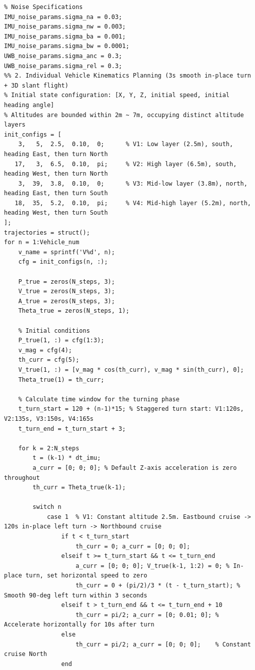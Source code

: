 \documentclass[twocolumn,10pt]{article}
\begin{document}
\begin{lstlisting}
% Noise Specifications
IMU_noise_params.sigma_na = 0.03;      
IMU_noise_params.sigma_nw = 0.003;     
IMU_noise_params.sigma_ba = 0.001;     
IMU_noise_params.sigma_bw = 0.0001;    
UWB_noise_params.sigma_anc = 0.3;     
UWB_noise_params.sigma_rel = 0.3;  
%% 2. Individual Vehicle Kinematics Planning (3s smooth in-place turn + 3D slant flight)
% Initial state configuration: [X, Y, Z, initial speed, initial heading angle]
% Altitudes are bounded within 2m ~ 7m, occupying distinct altitude layers
init_configs = [
    3,   5,  2.5,  0.10,  0;      % V1: Low layer (2.5m), south, heading East, then turn North
   17,   3,  6.5,  0.10,  pi;     % V2: High layer (6.5m), south, heading West, then turn North
    3,  39,  3.8,  0.10,  0;      % V3: Mid-low layer (3.8m), north, heading East, then turn South
   18,  35,  5.2,  0.10,  pi;     % V4: Mid-high layer (5.2m), north, heading West, then turn South
];
trajectories = struct();
for n = 1:Vehicle_num
    v_name = sprintf('V%d', n);
    cfg = init_configs(n, :);
    
    P_true = zeros(N_steps, 3);
    V_true = zeros(N_steps, 3);
    A_true = zeros(N_steps, 3);
    Theta_true = zeros(N_steps, 1);
    
    % Initial conditions
    P_true(1, :) = cfg(1:3);
    v_mag = cfg(4);
    th_curr = cfg(5);
    V_true(1, :) = [v_mag * cos(th_curr), v_mag * sin(th_curr), 0];
    Theta_true(1) = th_curr;
    
    % Calculate time window for the turning phase
    t_turn_start = 120 + (n-1)*15; % Staggered turn start: V1:120s, V2:135s, V3:150s, V4:165s
    t_turn_end = t_turn_start + 3;
    
    for k = 2:N_steps
        t = (k-1) * dt_imu;
        a_curr = [0; 0; 0]; % Default Z-axis acceleration is zero throughout
        th_curr = Theta_true(k-1);
        
        switch n
            case 1  % V1: Constant altitude 2.5m. Eastbound cruise -> 120s in-place left turn -> Northbound cruise
                if t < t_turn_start
                    th_curr = 0; a_curr = [0; 0; 0];
                elseif t >= t_turn_start && t <= t_turn_end
                    a_curr = [0; 0; 0]; V_true(k-1, 1:2) = 0; % In-place turn, set horizontal speed to zero
                    th_curr = 0 + (pi/2)/3 * (t - t_turn_start); % Smooth 90-deg left turn within 3 seconds
                elseif t > t_turn_end && t <= t_turn_end + 10
                    th_curr = pi/2; a_curr = [0; 0.01; 0]; % Accelerate horizontally for 10s after turn
                else
                    th_curr = pi/2; a_curr = [0; 0; 0];    % Constant cruise North
                end
                

\end{lstlisting}
\end{document}
